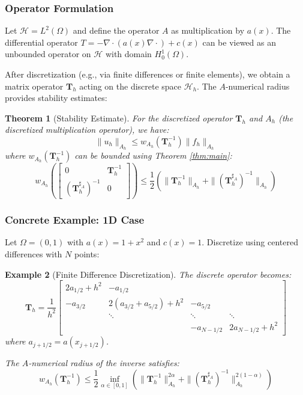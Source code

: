 \documentclass{article}
\newtheorem{theorem}{Theorem}[section]
\newtheorem{example}[theorem]{Example}
\begin{document}
\subsubsection{Operator Formulation}
Let $\mathcal{H} = L^2(\Omega)$ and define the operator $A$ as multiplication by $a(x)$. The differential operator $T = -\nabla \cdot (a(x)\nabla \cdot) + c(x)$ can be viewed as an unbounded operator on $\mathcal{H}$ with domain $H^1_0(\Omega)$.

After discretization (e.g., via finite differences or finite elements), we obtain a matrix operator $\mathbf{T}_h$ acting on the discrete space $\mathcal{H}_h$. The $A$-numerical radius provides stability estimates:

\begin{theorem}[Stability Estimate]
For the discretized operator $\mathbf{T}_h$ and $A_h$ (the discretized multiplication operator), we have:
\[
\|u_h\|_{A_h} \leq w_{A_h}(\mathbf{T}_h^{-1})\|f_h\|_{A_h}
\]
where $w_{A_h}(\mathbf{T}_h^{-1})$ can be bounded using Theorem \ref{thm:main}:
\[
w_{A_h}\left(\begin{bmatrix} 0 & \mathbf{T}_h^{-1} \\ (\mathbf{T}_h^{\sharp_A})^{-1} & 0 \end{bmatrix}\right) \leq \frac{1}{2}\left(\|\mathbf{T}_h^{-1}\|_{A_h} + \|(\mathbf{T}_h^{\sharp_A})^{-1}\|_{A_h}\right)
\]
\end{theorem}

\subsubsection{Concrete Example: 1D Case}
Let $\Omega = (0,1)$ with $a(x) = 1 + x^2$ and $c(x) = 1$. Discretize using centered differences with $N$ points:

\begin{example}[Finite Difference Discretization]
The discrete operator becomes:
\[
\mathbf{T}_h = \frac{1}{h^2}\begin{bmatrix}
2a_{1/2} + h^2 & -a_{1/2} & & \\
-a_{3/2} & 2(a_{3/2} + a_{5/2}) + h^2 & -a_{5/2} & \\
& \ddots & \ddots & \ddots \\
& & -a_{N-1/2} & 2a_{N-1/2} + h^2
\end{bmatrix}
\]
where $a_{j+1/2} = a(x_{j+1/2})$.

The $A$-numerical radius of the inverse satisfies:
\[
w_{A_h}(\mathbf{T}_h^{-1}) \leq \frac{1}{2}\inf_{\alpha \in [0,1]} \left(\|\mathbf{T}_h^{-1}\|_{A_h}^{2\alpha} + \|(\mathbf{T}_h^{\sharp_A})^{-1}\|_{A_h}^{2(1-\alpha)}\right)
\]
\end{example}
\end{document}
